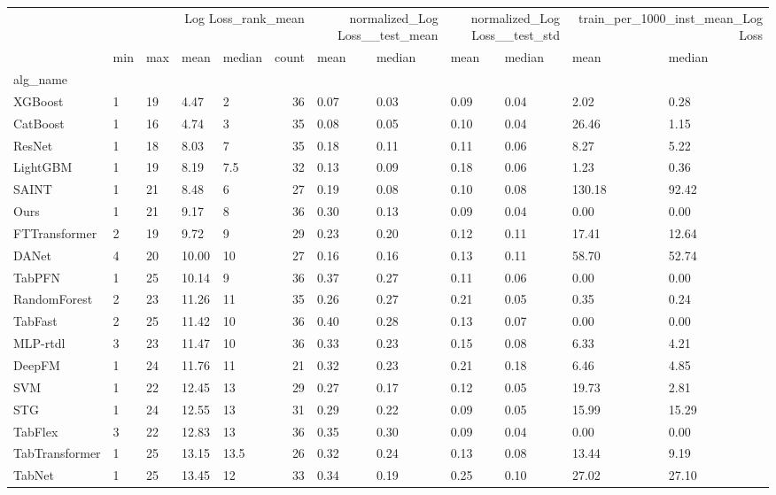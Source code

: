 \begin{tabular}{lllllrllllll}
\toprule
 & \multicolumn{5}{r}{Log Loss_rank_mean} & \multicolumn{2}{r}{normalized_Log Loss__test_mean} & \multicolumn{2}{r}{normalized_Log Loss__test_std} & \multicolumn{2}{r}{train_per_1000_inst_mean_Log Loss} \\
 & min & max & mean & median & count & mean & median & mean & median & mean & median \\
alg_name &  &  &  &  &  &  &  &  &  &  &  \\
\midrule
XGBoost & 1 & 19 & 4.47 & 2 & 36 & 0.07 & 0.03 & 0.09 & 0.04 & 2.02 & 0.28 \\
CatBoost & 1 & 16 & 4.74 & 3 & 35 & 0.08 & 0.05 & 0.10 & 0.04 & 26.46 & 1.15 \\
ResNet & 1 & 18 & 8.03 & 7 & 35 & 0.18 & 0.11 & 0.11 & 0.06 & 8.27 & 5.22 \\
LightGBM & 1 & 19 & 8.19 & 7.5 & 32 & 0.13 & 0.09 & 0.18 & 0.06 & 1.23 & 0.36 \\
SAINT & 1 & 21 & 8.48 & 6 & 27 & 0.19 & 0.08 & 0.10 & 0.08 & 130.18 & 92.42 \\
Ours & 1 & 21 & 9.17 & 8 & 36 & 0.30 & 0.13 & 0.09 & 0.04 & 0.00 & 0.00 \\
FTTransformer & 2 & 19 & 9.72 & 9 & 29 & 0.23 & 0.20 & 0.12 & 0.11 & 17.41 & 12.64 \\
DANet & 4 & 20 & 10.00 & 10 & 27 & 0.16 & 0.16 & 0.13 & 0.11 & 58.70 & 52.74 \\
TabPFN & 1 & 25 & 10.14 & 9 & 36 & 0.37 & 0.27 & 0.11 & 0.06 & 0.00 & 0.00 \\
RandomForest & 2 & 23 & 11.26 & 11 & 35 & 0.26 & 0.27 & 0.21 & 0.05 & 0.35 & 0.24 \\
TabFast & 2 & 25 & 11.42 & 10 & 36 & 0.40 & 0.28 & 0.13 & 0.07 & 0.00 & 0.00 \\
MLP-rtdl & 3 & 23 & 11.47 & 10 & 36 & 0.33 & 0.23 & 0.15 & 0.08 & 6.33 & 4.21 \\
DeepFM & 1 & 24 & 11.76 & 11 & 21 & 0.32 & 0.23 & 0.21 & 0.18 & 6.46 & 4.85 \\
SVM & 1 & 22 & 12.45 & 13 & 29 & 0.27 & 0.17 & 0.12 & 0.05 & 19.73 & 2.81 \\
STG & 1 & 24 & 12.55 & 13 & 31 & 0.29 & 0.22 & 0.09 & 0.05 & 15.99 & 15.29 \\
TabFlex & 3 & 22 & 12.83 & 13 & 36 & 0.35 & 0.30 & 0.09 & 0.04 & 0.00 & 0.00 \\
TabTransformer & 1 & 25 & 13.15 & 13.5 & 26 & 0.32 & 0.24 & 0.13 & 0.08 & 13.44 & 9.19 \\
TabNet & 1 & 25 & 13.45 & 12 & 33 & 0.34 & 0.19 & 0.25 & 0.10 & 27.02 & 27.10 \\

\end{tabular}

